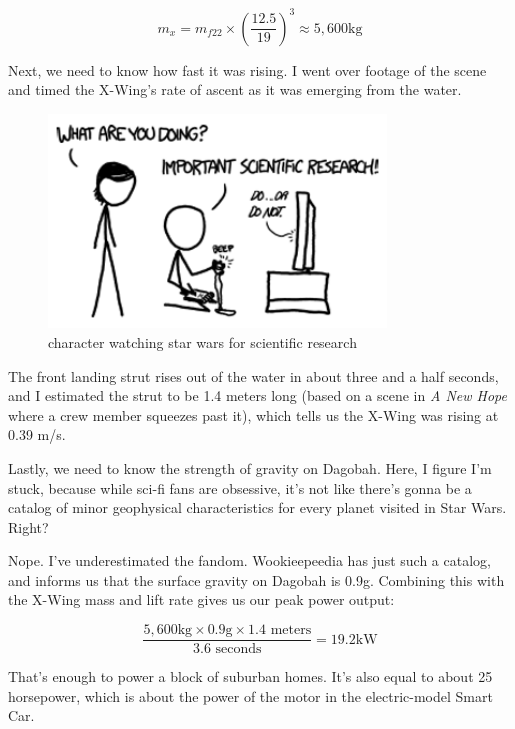 {\[m_{x} = m_{f22}\times\left(\frac{12.5}{19}\right)^{3}\approx 5,600\mathrm{kg}\]}

{Next, we need to know how fast it was rising. I went over footage of the scene and timed the X-Wing's rate of ascent as it was emerging from the water.}

\begin{figure}[!htbp]
\centering
\includegraphics[scale=0.5, max width=0.8\textwidth]{imgs/a/3/04.png}
\caption{character watching star wars for scientific research}
\end{figure}

{The front landing strut rises out of the water in about three and a half seconds, and I estimated the strut to be 1.4 meters long (based on a scene in \emph{A New Hope} where a crew member squeezes past it), which tells us the X-Wing was rising at 0.39 m/s.}

{Lastly, we need to know the strength of gravity on Dagobah. Here, I figure I’m stuck, because while sci-fi fans are obsessive, it’s not like there’s gonna be a catalog of minor geophysical characteristics for every planet visited in Star Wars. Right?}

{Nope. I’ve underestimated the fandom. Wookieepeedia has just such a catalog, and informs us that the surface gravity on Dagobah is 0.9g. Combining this with the X-Wing mass and lift rate gives us our peak power output:}

{\[\frac{5,600\mathrm{kg}\times 0.9\mathrm{g}\times 1.4\text{ meters}}{3.6\text{ seconds}} = 19.2\mathrm{kW}\]}

{That’s enough to power a block of suburban homes. It’s also equal to about 25 horsepower, which is about the power of the motor in the electric-model Smart Car.}

